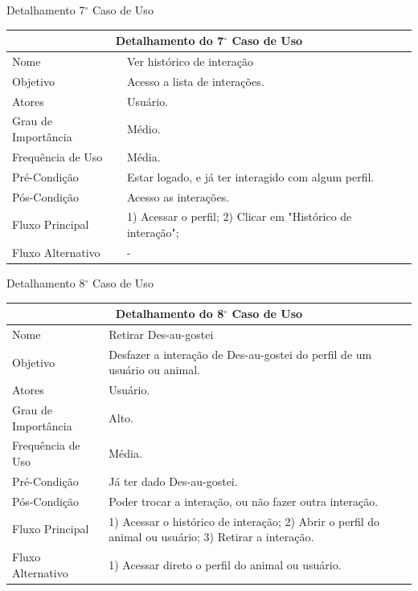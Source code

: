 \begin{apendicesenv}
\begin{quadro}[!htbp]
\caption[Detalhamento 7$^\circ$ Caso de Uso]{Detalhamento 7$^\circ$ Caso de Uso}
\begin{tabular}{|p{4cm}|p{9.95cm}|}
\hline
\multicolumn{2}{|c|}{Detalhamento do 7$^\circ$ Caso de Uso}\\ 
\hline
Nome & Ver histórico de interação \\
\hline
Objetivo & Acesso a lista de interações. \\
\hline
Atores & Usuário. \\
\hline
Grau de Importância & Médio.\\
\hline
Frequência de Uso & Média. \\
\hline
Pré-Condição & Estar logado, e já ter interagido com algum perfil. \\
\hline
Pós-Condição & Acesso as interações. \\
\hline
Fluxo Principal & 1) Acessar o perfil; 2) Clicar em "Histórico de interação"; \\
\hline
Fluxo Alternativo & - \\
\hline
\end{tabular}
\end{quadro}

\begin{quadro}[!htbp]
\caption[Detalhamento 8$^\circ$ Caso de Uso]{Detalhamento 8$^\circ$ Caso de Uso}
\begin{tabular}{|p{4cm}|p{9.95cm}|}
\hline
\multicolumn{2}{|c|}{Detalhamento do 8$^\circ$ Caso de Uso}\\ 
\hline
Nome & Retirar \gls{Des-au-gostei} \\
\hline
Objetivo & Desfazer a interação de \gls{Des-au-gostei} do perfil de um usuário ou animal. \\
\hline
Atores & Usuário. \\
\hline
Grau de Importância & Alto. \\
\hline
Frequência de Uso & Média. \\
\hline
Pré-Condição & Já ter dado \gls{Des-au-gostei}. \\
\hline
Pós-Condição & Poder trocar a interação, ou não fazer outra interação. \\
\hline
Fluxo Principal & 1) Acessar o histórico de interação; 2) Abrir o perfil do animal ou usuário; 3) Retirar a interação. \\
\hline
Fluxo Alternativo & 1) Acessar direto o perfil do animal ou usuário. \\
\hline
\end{tabular}
\end{quadro}


\end{apendicesenv}
